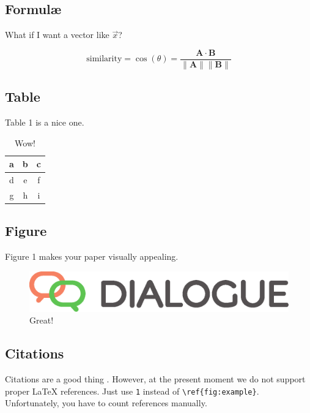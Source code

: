 \documentclass{dialogue}
\begin{document}
\subsection{Formul\ae}

What if I want a vector like $\vec{x}$?

\begin{equation}
  \text{similarity} = \cos(\theta) = \frac{\mathbf{A} \cdot \mathbf{B}}{\|\mathbf{A}\| \|\mathbf{B}\|}
\end{equation}

\subsection{Table}

Table 1 is a nice one.

\begin{table}[htbp]
\centering
\caption{Wow!}
\begin{tabular}{|c|c|c|}\hline
a & b & c \\\hline
d & e & f \\\hline
g & h & i \\\hline
\end{tabular}
\end{table}

\subsection{Figure}

Figure 1 makes your paper visually appealing.

\begin{figure}[htbp]
\centering
\includegraphics[scale=.4]{dialogue.eps}
\caption{Great!}
\end{figure}

\subsection{Citations}

Citations are a good thing \cite{Panchenko:18,Sharoff:11}. However, at the present moment we do not support proper {\LaTeX} references. Just use \verb|1| instead of \verb|\ref{fig:example}|. Unfortunately, you have to count references manually.
\end{document}
